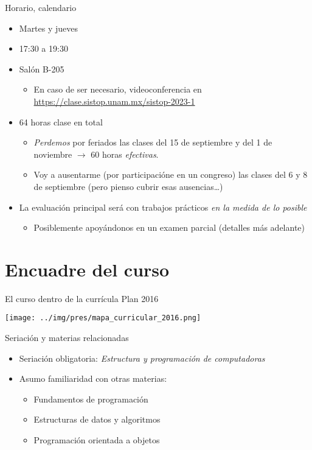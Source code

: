 \documentclass[presentation]{beamer}
\begin{document}
\begin{frame}[label={sec:org5fb3b3f}]{Horario, calendario}
\begin{itemize}
\item Martes y jueves
\item 17:30 a 19:30
\item Salón B-205
\begin{itemize}
\item En caso de ser necesario, videoconferencia en
\url{https://clase.sistop.unam.mx/sistop-2023-1}
\end{itemize}
\item 64 horas clase en total
\begin{itemize}
\item \emph{Perdemos} por feriados las clases del 15 de septiembre y del 1 de
noviembre \(\rightarrow\) \alert{60 horas} \emph{efectivas}.
\item Voy a ausentarme (por participacióne en un congreso) las clases
del 6 y 8 de septiembre (pero pienso cubrir esas ausencias\ldots{})
\end{itemize}
\item La evaluación principal será con trabajos prácticos \emph{en la medida de
lo posible}
\begin{itemize}
\item Posiblemente apoyándonos en un examen parcial (detalles más adelante)
\end{itemize}
\end{itemize}
\end{frame}

\section{Encuadre del curso}
\label{sec:orgea99ad2}

\begin{frame}[label={sec:org1f2323e}]{El curso dentro de la currícula}
\centering Plan 2016
\begin{center}
\texttt{[image: ../img/pres/mapa\_curricular\_2016.png]}
\end{center}
\end{frame}

\begin{frame}[label={sec:org131db96}]{Seriación y materias relacionadas}
\begin{itemize}
\item Seriación obligatoria: \emph{Estructura y programación de computadoras}
\item Asumo familiaridad con otras materias:
\begin{itemize}
\item Fundamentos de programación
\item Estructuras de datos y algoritmos
\item Programación orientada a objetos
\end{itemize}
\end{itemize}
\end{frame}
\end{document}
